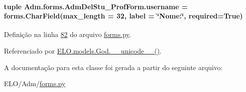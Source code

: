 \paragraph[{username}]{\setlength{\rightskip}{0pt plus 5cm}tuple Adm.\+forms.\+Adm\+Del\+Stu\+\_\+\+Prof\+Form.\+username = forms.\+Char\+Field(max\+\_\+length = 32, label = \char`\"{}Nome\+:\char`\"{}, required=True)\hspace{0.3cm}{\ttfamily [static]}}\label{classAdm_1_1forms_1_1AdmDelStu__ProfForm_a780eaf9b2d36cd160f6e574fe9023452}


Definição na linha \hyperlink{Adm_2forms_8py_source_l00082}{82} do arquivo \hyperlink{Adm_2forms_8py_source}{forms.\+py}.



Referenciado por \hyperlink{classELO_1_1models_1_1God_ad885cef3d586b18dd3639ebf3bfd66eb}{E\+L\+O.\+models.\+God.\+\_\+\+\_\+unicode\+\_\+\+\_\+()}.



A documentação para esta classe foi gerada a partir do seguinte arquivo\+:\begin{DoxyCompactItemize}
\item 
E\+L\+O/\+Adm/\hyperlink{Adm_2forms_8py}{forms.\+py}\end{DoxyCompactItemize}
